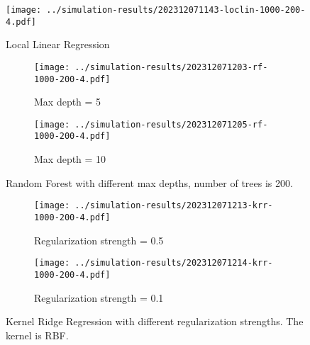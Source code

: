 \documentclass[12pt]{article}
\begin{document}
        \begin{figure}[htbp]
            \centering
            \texttt{[image: ../simulation-results/202312071143-loclin-1000-200-4.pdf]}
            \caption{Local Linear Regression}
            \label{fig:loclin}
        \end{figure}
        \begin{figure}[ht]
            \centering
            \begin{subfigure}[b]{0.45\textwidth}
                \texttt{[image: ../simulation-results/202312071203-rf-1000-200-4.pdf]}
                \caption{Max depth = 5}
                \label{fig:1}
            \end{subfigure}
            \hfill
            \begin{subfigure}[b]{0.45\textwidth}
                \texttt{[image: ../simulation-results/202312071205-rf-1000-200-4.pdf]}
                \caption{Max depth = 10}
                \label{fig:2}
            \end{subfigure}
            \caption{Random Forest with different max depths, number of trees is 200.}
            \label{fig:comparison1}
        \end{figure}


        \begin{figure}[ht]
            \centering
            \begin{subfigure}[b]{0.45\textwidth}
                \texttt{[image: ../simulation-results/202312071213-krr-1000-200-4.pdf]}
                \caption{Regularization strength = 0.5}
                \label{fig:krr-1}
            \end{subfigure}
            \hfill
            \begin{subfigure}[b]{0.45\textwidth}
                \texttt{[image: ../simulation-results/202312071214-krr-1000-200-4.pdf]}
                \caption{Regularization strength = 0.1}
                \label{fig:krr-2}
            \end{subfigure}
            \caption{Kernel Ridge Regression with different regularization strengths. The kernel is RBF.}
            \label{fig:comparison2}
        \end{figure}
        
\end{document}
